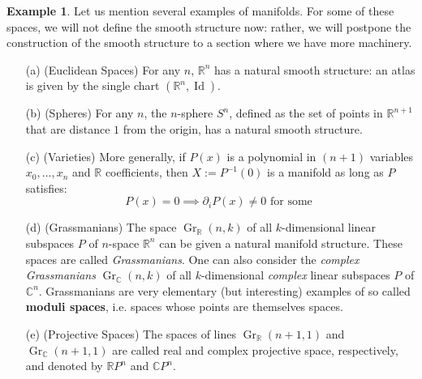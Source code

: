 \documentclass[12pt]{article}
\theoremstyle{definition}
\newtheorem{example}[theorem]{Example}
\numberwithin{equation}{section}
\newcommand{\C}{{\mathbb C}}
\newcommand{\R}{{\mathbb R}}
\newcommand{\op}{\operatorname}
\begin{document}
\begin{example} \label{ex:manifolds} Let us mention several examples of manifolds. For some of these spaces, we will not define the smooth structure now: rather, we will postpone the construction of the smooth structure to a section where we have more machinery.

\begin{enumerate}
	\item[(a)] (Euclidean Spaces) For any $n$, $\R^n$ has a natural smooth structure: an atlas is given by the single chart $(\R^n,\op{Id})$. 
	\item[(b)] (Spheres) For any $n$, the $n$-sphere $S^n$, defined as the set of points in $\R^{n+1}$ that are distance $1$ from the origin, has a natural smooth structure.
	\item[(c)] (Varieties) More generally, if $P(x)$ is a polynomial in $(n+1)$ variables $x_0,\dots,x_n$ and $\R$ coefficients, then $X := P^{-1}(0)$ is a manifold as long as $P$ satisfies:
	\[
	P(x) = 0 \implies \partial_i P(x) \neq 0 \text{ for some }
	\]
	\item[(d)] (Grassmanians) The space $\op{Gr}_\R(n,k)$ of all $k$-dimensional linear subspaces $P$ of $n$-space $\R^n$ can be given a natural manifold structure. These spaces are called \emph{Grassmanians}. One can also consider the \emph{complex Grassmanians} $\op{Gr}_\C(n,k)$ of all $k$-dimensional \emph{complex} linear subspaces $P$ of $\C^n$. Grassmanians are very elementary (but interesting) examples of so called {\bf moduli spaces}, i.e. spaces whose points are themselves spaces. 

	\item[(e)] (Projective Spaces) The spaces of lines $\op{Gr}_\R(n+1,1)$ and $\op{Gr}_\C(n+1,1)$ are called real and complex projective space, respectively, and denoted by $\R P^n$ and $\C P^n$.  

\end{enumerate} 
\end{example}
\end{document}
